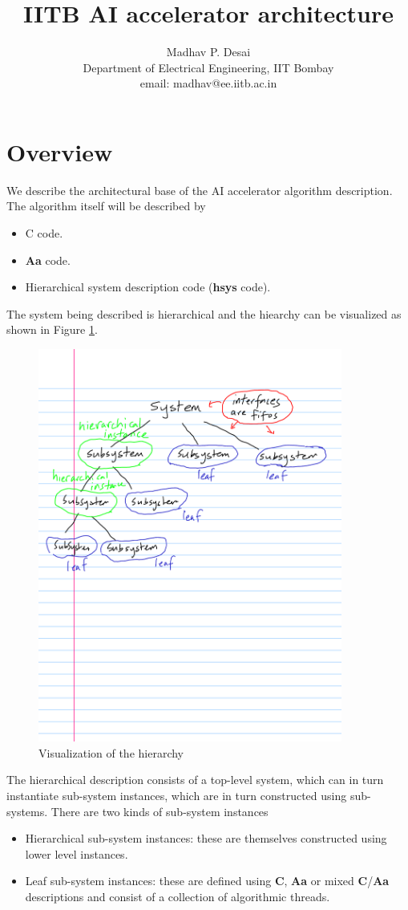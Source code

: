 \documentclass{article}
\title{IITB AI accelerator architecture}
\author{Madhav P. Desai \\ Department of Electrical Engineering, IIT Bombay \\ email: madhav@ee.iitb.ac.in}
\begin{document}
\maketitle


\section{Overview}

We describe the architectural base of the AI accelerator algorithm description.
The algorithm itself will be described by 
\begin{itemize}
\item C code.
\item {\bf Aa} code.
\item Hierarchical system description code ({\bf hsys} code).
\end{itemize}

The system being described is hierarchical and the
hiearchy can be visualized as shown in Figure \ref{fig:hierarchy}.
\begin{figure}
\centering
\includegraphics[width=10cm]{figs/hierarchy.pdf}
\caption{Visualization of the hierarchy}
\label{fig:hierarchy}
\end{figure}

The hierarchical description consists of a top-level system, which
can in turn instantiate sub-system instances, which are in turn constructed
using sub-systems.  There are two kinds of sub-system instances
\begin{itemize}
\item Hierarchical sub-system instances:  these are themselves constructed using
lower level instances.
\item Leaf sub-system instances: these are defined using {\bf C}, {\bf Aa} or
mixed {\bf C}/{\bf Aa} descriptions and consist of a collection of algorithmic
threads.
\end{itemize}
\end{document}
